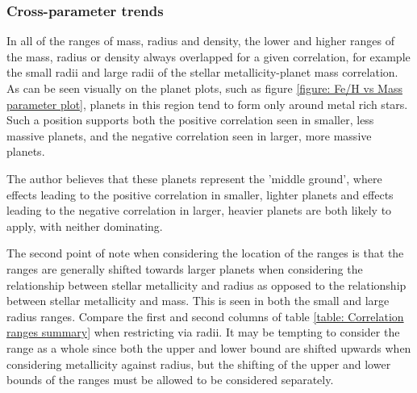 \documentclass[a4paper,twocolumn,12pt]{article}
\begin{document}


\subsubsection{Cross-parameter trends}

In all of the ranges of mass, radius and density, the lower and higher ranges of the mass, radius or density always overlapped for a given correlation, for example the small radii and large radii of the stellar metallicity-planet mass correlation. As can be seen visually on the planet plots, such as figure \ref{figure: Fe/H vs Mass parameter plot}, planets in this region tend to form only around metal rich stars. Such a position supports both the positive correlation seen in smaller, less massive planets, and the negative correlation seen in larger, more massive planets.

The author believes that these planets represent the 'middle ground', where effects leading to the positive correlation in smaller, lighter planets and effects leading to the negative correlation in larger, heavier planets are both likely to apply, with neither dominating.


The second point of note when considering the location of the ranges is that the ranges are generally shifted towards larger 
planets when considering the relationship between stellar metallicity and radius as opposed to the relationship between stellar metallicity and mass. This is seen in both the small and large radius ranges. Compare the first and second columns of table \ref{table: Correlation ranges summary} when restricting via radii.
It may be tempting to consider the range as a whole since both the upper and lower bound are shifted upwards when considering metallicity against radius, but the shifting of the upper and lower bounds of the ranges must be allowed to be considered separately.
\end{document}
